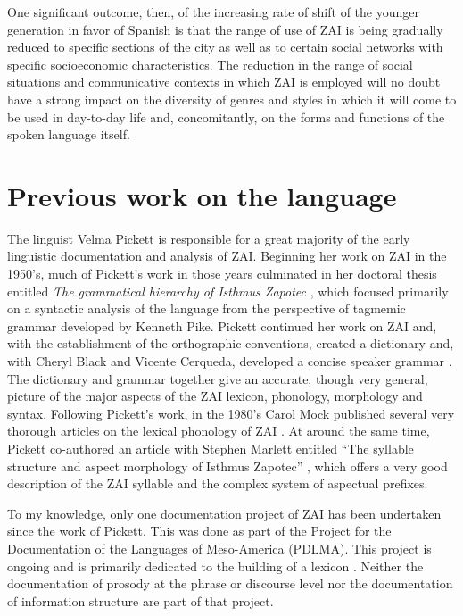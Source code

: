 One significant outcome, then, of the increasing rate of shift of the younger generation in favor of Spanish is that the range of use of ZAI is being gradually reduced to specific sections of the city as well as to certain social networks with specific socioeconomic characteristics. The reduction in the range of social situations and communicative contexts in which ZAI is employed will no doubt have a strong impact on the diversity of genres and styles in which it will come to be used in day-to-day life and, concomitantly, on the forms and functions of the spoken language itself.



\section{Previous work on the language}

The linguist Velma Pickett is responsible for a great majority of the early linguistic documentation and analysis of ZAI.  Beginning her work on ZAI in the 1950's, much of Pickett's work in those years culminated in her doctoral thesis entitled \textit{The grammatical hierarchy of Isthmus Zapotec} \citep{pickett1960}, which focused primarily on a syntactic analysis of the language from the perspective of tagmemic grammar developed by Kenneth Pike. Pickett continued her work on ZAI and, with the establishment of the orthographic conventions, created a dictionary \citep{pickett1979} and, with Cheryl Black and Vicente Cerqueda, developed a concise speaker grammar \citep{pickett1998}. The dictionary and grammar together give an accurate, though very general, picture of the major aspects of the ZAI lexicon, phonology, morphology and syntax. Following Pickett's work, in the 1980's Carol Mock published several very thorough articles on the lexical phonology of ZAI \citep{mock1983,mock1985a,mock1985b,mock1988}. At around the same time, Pickett co-authored an article with Stephen Marlett entitled ``The syllable structure and aspect morphology of Isthmus Zapotec'' \citep{marlett1987}, which offers a very good description of the ZAI syllable and the complex system of aspectual prefixes. 

To my knowledge, only one documentation project of ZAI has been undertaken since the work of Pickett. This was done as part of the Project for the Documentation of the Languages of Meso-America (PDLMA). This project is ongoing and is primarily dedicated to the building of a lexicon \citep{perezms}. Neither the documentation of prosody at the phrase or discourse level nor the documentation of information structure are part of that project. 

